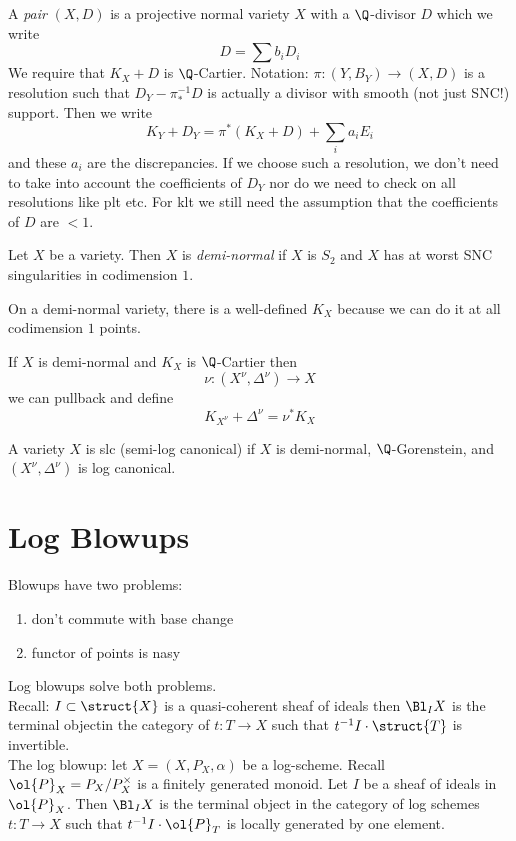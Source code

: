 \documentclass[12pt]{article}
\theoremstyle{plain}
\begin{document}
A \textit{pair} $(X, D)$ is a projective normal variety $X$ with a $\Q$-divisor $D$ which we write
\[ D = \sum b_i D_i \]
We require that $K_X + D$ is $\Q$-Cartier.
Notation: $\pi : (Y, B_Y) \to (X, D)$ is a resolution such that $D_Y - \pi_*^{-1} D$ is actually a divisor with smooth (not just SNC!) support. Then we write
\[ K_Y + D_Y = \pi^* (K_X + D) + \sum_i a_i E_i \]
and these $a_i$ are the discrepancies. If we choose such a resolution, we don't need to take into account the coefficients of $D_Y$ nor do we need to check on all resolutions like plt etc. For klt we still need the assumption that the coefficients of $D$ are $<1$. 

\begin{defn}
Let $X$ be a variety. Then $X$ is \textit{demi-normal} if $X$ is $S_2$ and $X$ has at worst SNC singularities in codimension $1$. 
\end{defn}

On a demi-normal variety, there is a well-defined $K_X$ because we can do it at all codimension $1$ points. 
\par 
If $X$ is demi-normal and $K_X$ is $\Q$-Cartier then
\[ \nu : (X^\nu, \Delta^{\nu}) \to X \]
we can pullback and define
\[ K_{X^\nu} + \Delta^\nu = \nu^* K_X \]
\begin{defn}
A variety $X$ is slc (semi-log canonical) if $X$ is demi-normal, $\Q$-Gorenstein, and $(X^\nu, \Delta^\nu)$ is log canonical. 
\end{defn}

\section{Log Blowups}

Blowups have two problems:

\begin{enumerate}
\item don't commute with base change
\item functor of points is nasy
\end{enumerate}
Log blowups solve both problems.
\bigskip\\
Recall: $I \subset \struct{X}$ is a quasi-coherent sheaf of ideals then $\Bl_I X$ is the terminal objectin the category of $t : T \to X$ such that $t^{-1} I \cdot \struct{T}$ is invertible. 
\bigskip\\
The log blowup: let $X = (X, P_X, \alpha)$ be a log-scheme. Recall $\ol{P}_X = P_X / P_X^\times$ is a finitely generated monoid. Let $I$ be a sheaf of ideals in $\ol{P}_X$. Then $\Bl_I X$ is the terminal object in the category of log schemes $t : T \to X$ such that $t^{-1} I \cdot \ol{P}_T$ is locally generated by one element. 
\end{document}

